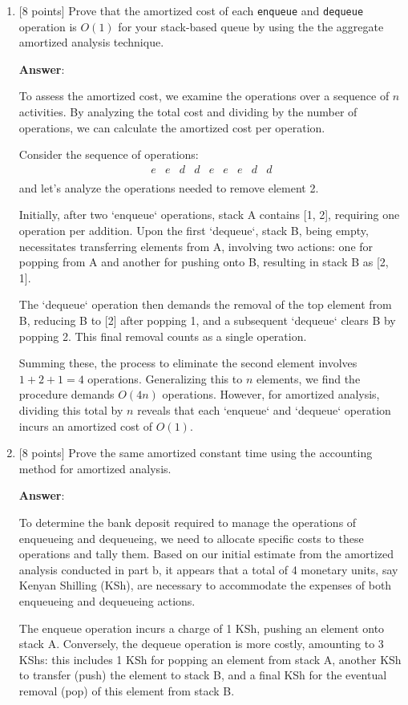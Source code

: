 \documentclass[11pt]{article}
\begin{document}
\begin{enumerate}
\begin{enumerate}
\item {[8 points]} Prove that the amortized cost of each {\tt enqueue} and {\tt dequeue} operation  is $O(1)$ for your stack-based queue by using the the aggregate amortized analysis technique.

\textbf{Answer}:

To assess the amortized cost, we examine the operations over a sequence of \(n\) activities. By analyzing the total cost and dividing by the number of operations, we can calculate the amortized cost per operation.

Consider the sequence of operations:
\[
\begin{array}{ccccccccc}
e & e & d & d & e & e & e & d & d \\
\end{array}
\]
and let's analyze the operations needed to remove element 2.

Initially, after two `enqueue` operations, stack A contains [1, 2], requiring one operation per addition. Upon the first `dequeue`, stack B, being empty, necessitates transferring elements from A, involving two actions: one for popping from A and another for pushing onto B, resulting in stack B as [2, 1].

The `dequeue` operation then demands the removal of the top element from B, reducing B to [2] after popping 1, and a subsequent `dequeue` clears B by popping 2. This final removal counts as a single operation.

Summing these, the process to eliminate the second element involves $1+2+1=4$ operations. Generalizing this to $n$ elements, we find the procedure demands $O(4n)$ operations. However, for amortized analysis, dividing this total by $n$ reveals that each `enqueue` and `dequeue` operation incurs an amortized cost of $O(1)$.

\item {[8 points]} Prove the same amortized constant time using the accounting method for amortized analysis.

\textbf{Answer}:

To determine the bank deposit required to manage the operations of enqueueing and dequeueing, we need to allocate specific costs to these operations and tally them. Based on our initial estimate from the amortized analysis conducted in part b, it appears that a total of 4 monetary units, say Kenyan Shilling (KSh), are necessary to accommodate the expenses of both enqueueing and dequeueing actions.

The enqueue operation incurs a charge of 1 KSh, pushing an element onto stack A. Conversely, the dequeue operation is more costly, amounting to 3 KShs: this includes 1 KSh for popping an element from stack A, another KSh to transfer (push) the element to stack B, and a final KSh for the eventual removal (pop) of this element from stack B.


\end{enumerate}
\end{enumerate}
\end{document}
